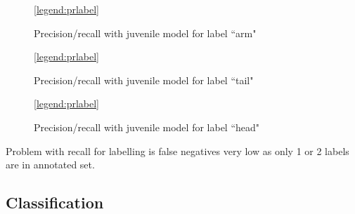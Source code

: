 \begin{figure}[H]
\centering
{}
\ref{legend:prlabel}
\caption{Precision/recall with juvenile model for label ``arm"}
\end{figure}

\begin{figure}[H]
\centering
{}
\ref{legend:prlabel}
\caption{Precision/recall with juvenile model for label ``tail"}
\end{figure}

\begin{figure}[H]
\centering
{}
\ref{legend:prlabel}
\caption{Precision/recall with juvenile model for label ``head"}
\end{figure}

Problem with recall for labelling is false negatives very low as only 1 or 2 labels are in annotated set. 


\subsection{Classification}

